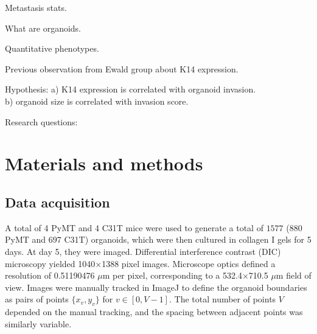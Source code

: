 \documentclass[10pt,letterpaper]{article}
\begin{document}
Metastasis stats.

What are organoids.

Quantitative phenotypes.

Previous observation from Ewald group about K14 expression.

Hypothesis: a) K14 expression is correlated with organoid invasion.\\
b) organoid size is correlated with invasion score.

Research questions:


\section*{Materials and methods}
\subsection*{Data acquisition}

 A total of 4 PyMT and 4 C31T mice were used to generate a total of $1577$ ($880$ PyMT and $697$ C31T) organoids, which were then cultured in collagen I gels for 5 days. At day 5, they were imaged. Differential interference contrast (DIC) microscopy yielded 1040$\times$1388 pixel images. Microscope optics defined a resolution of 0.51190476 $\mu$m per pixel, corresponding to a 532.4$\times$710.5 $\mu$m field of view. Images were manually tracked in {\sc ImageJ} \cite{Schneider:2012ui} to define the organoid boundaries as pairs of points $\{x_v,y_v\}$ for $v \in [0,V-1]$. The total number of points $V$ depended on the manual tracking, and the spacing between adjacent points was similarly variable.

\end{document}
